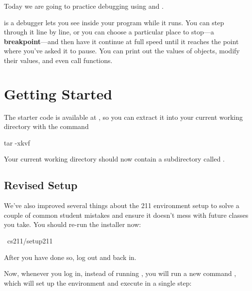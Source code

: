 \documentclass{tufte-handout}
\begin{document}

\maketitle

Today we are going to practice debugging using  and
.

 is a debugger lets you see inside your program while it runs. You can step
through it line by line, or you can choose a particular place to stop—a
\textbf{breakpoint}—and then have it continue at full speed until it reaches
the point where you’ve asked it to pause. You can print out the values of
objects, modify their values, and even call functions.


\section{Getting Started}

The starter code is available at \filename{\ThisLabTgz}, so you can
extract it into your current working directory with the command

\begin{CmdLine*}
  \C tar -xkvf \ThisLabTgz\\
\end{CmdLine*}

\noindent Your current working directory should now contain a
subdirectory called \filename{\ThisLabBase}.


\subsection{Revised Setup}

We've also improved several things about the 211 environment setup
to solve a couple of common student mistakes and ensure it doesn't
mess with future classes you take. You should re-run the installer now:

\begin{CmdLine*}
  \C ~cs211/setup211\\
\end{CmdLine*}

After you have done so, log out and back in.

Now, whenever you log in, instead of running , you
will run a new command , which will set up the environment
and execute  in a single step:
\end{document}
